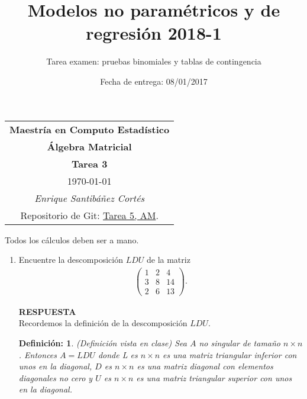 \documentclass[11pt,letterpaper]{article}
\title{Modelos no paramétricos y de regresión 2018-1}
\author{Tarea examen: pruebas binomiales y tablas de contingencia}
\date{Fecha de entrega: 08/01/2017}
\newcommand{\res}{\textbf{RESPUESTA}\\}
\newtheorem{thmd}{Definición:}
\begin{document}
\begin{table}[ht]
\centering
\begin{tabular}{c}
\textbf{Maestría en Computo Estadístico}\\
\textbf{Álgebra Matricial} \\
\textbf{Tarea 3}\\
\today \\
\emph{Enrique Santibáñez Cortés}\\
Repositorio de Git: \href{https://github.com/Enriquesec/Algebra_matricial/tree/master/tareas/Tarea_5}{Tarea 5, AM}.
\end{tabular}
\end{table}
Todos los cálculos deben ser a mano.
\begin{enumerate}

\item Encuentre la descomposición $LDU$ de la matriz
\begin{align*}
\begin{pmatrix}
1 & 2 & 4\\
3 & 8 & 14\\
2 & 6 & 13
\end{pmatrix}.
\end{align*}

\res
Recordemos la definición de la descomposición $LDU$.
\begin{framed}
    \begin{thmd} \label{descompotition_LDU}
    (Definición vista en clase) Sea $A$ no singular de tamaño $n\times n$. Entonces $A=LDU$ donde L es $n\times n$ es una matriz triangular inferior con unos en la diagonal, $D$ es $n\times n$ es una matriz diagonal con elementos diagonales no cero y $U$ es $n\times n$ es una matriz triangular superior con unos en la diagonal.
    \end{thmd}
\end{framed} 


\end{enumerate}
\end{document}
